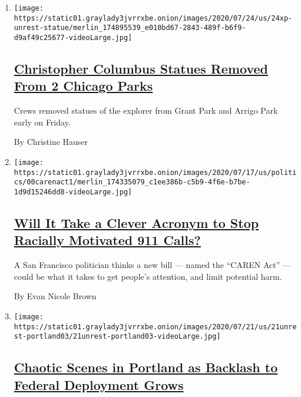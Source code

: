 \begin{enumerate}
\def\labelenumi{\arabic{enumi}.}
\item
  \texttt{[image: https://static01.graylady3jvrrxbe.onion/images/2020/07/24/us/24xp-unrest-statue/merlin\_174895539\_e010bd67-2843-489f-b6f9-d9af49c25677-videoLarge.jpg]}

  \hypertarget{christopher-columbus-statues-removed-from-2-chicago-parks}{%
  \subsection{\texorpdfstring{\href{/2020/07/24/us/christopher-columbus-chicago.html}{Christopher
  Columbus Statues Removed From 2 Chicago
  Parks}}{Christopher Columbus Statues Removed From 2 Chicago Parks}}\label{christopher-columbus-statues-removed-from-2-chicago-parks}}

  Crews removed statues of the explorer from Grant Park and Arrigo Park
  early on Friday.

  By Christine Hauser
\item
  \texttt{[image: https://static01.graylady3jvrrxbe.onion/images/2020/07/17/us/politics/00carenact1/merlin\_174335079\_c1ee386b-c5b9-4f6e-b7be-1d9d15246dd8-videoLarge.jpg]}

  \hypertarget{will-it-take-a-clever-acronym-to-stop-racially-motivated-911-calls}{%
  \subsection{\texorpdfstring{\href{/2020/07/24/briefing/caren-act-911-san-francisco.html}{Will
  It Take a Clever Acronym to Stop Racially Motivated 911
  Calls?}}{Will It Take a Clever Acronym to Stop Racially Motivated 911 Calls?}}\label{will-it-take-a-clever-acronym-to-stop-racially-motivated-911-calls}}

  A San Francisco politician thinks a new bill --- named the ``CAREN
  Act'' --- could be what it takes to get people's attention, and limit
  potential harm.

  By Evan Nicole Brown
\item
  \texttt{[image: https://static01.graylady3jvrrxbe.onion/images/2020/07/21/us/21unrest-portland03/21unrest-portland03-videoLarge.jpg]}

  \hypertarget{chaotic-scenes-in-portland-as-backlash-to-federal-deployment-grows}{%
  \subsection{\texorpdfstring{\href{/2020/07/21/us/portland-protests.html}{Chaotic
  Scenes in Portland as Backlash to Federal Deployment
  Grows}}{Chaotic Scenes in Portland as Backlash to Federal Deployment Grows}}\label{chaotic-scenes-in-portland-as-backlash-to-federal-deployment-grows}}


\end{enumerate}
